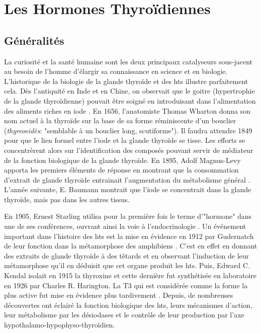 \documentclass[../main.tex]{subfiles}
\begin{document}
\chapter{Les Hormones Thyroïdiennes}


\section{Généralités}

La curiosité et la santé humaine sont les deux principaux catalyseurs sous-jacent au besoin de l'homme d'élargir sa connaissance en science et en biologie.
L'historique de la biologie de la glande thyroïde et des \glspl{ht} illustre parfaitement cela.
Dès l'antiquité en Inde et en Chine, on observait que le goitre (hypertrophie de la glande thyroïdienne) pouvait être soigné en introduisant dans l'alimentation des aliments riches en iode \citep{Niazi2011}.
En 1656, l'anatomiste Thomas Wharton donna son nom actuel à la thyroïde sur la base de sa forme réminiscente d'un bouclier (\textit{thyreoeidês}: "semblable à un bouclier long, scutiforme").
Il faudra attendre 1849 pour que le lien formel entre l'iode et la glande thyroïde se tisse.
Les efforts se concentrèrent alors sur l'identification des composés pouvant servir de médiateur de la fonction biologique de la glande thyroïde.
En 1895, Adolf Magnus-Levy apporta les premiers éléments de réponse en montrant que la consommation d'extrait de glande thyroïde entrainait l'augmentation du métabolisme général \citep{Magnus-Levy1895}.
L'année suivante, E. Baumann montrait que l'iode se concentrait dans la glande thyroïde, mais pas dans les autres tissus\citep{Baumann1896}.
\par
En 1905, Ernest Starling utilisa pour la première fois le terme d'"hormone" dans une de ses conférences, ouvrant ainsi la voie à l'endocrinologie .
Un événement important dans l'histoire des \glspl{ht} est la mise en évidence en 1912 par Gudernatch de leur fonction dans la métamorphose des amphibiens \citep{Gudernatsch1912}.
C'est en effet en donnant des extraits de glande thyroïde à des têtards et en observant l'induction de leur métamorphose qu'il en déduisit que cet organe produit les \glspl{ht}.
Puis, Edward C. Kendal isolait en 1915 la thyroxine et cette dernière fut synthétisée en laboratoire en 1926 par Charles R. Harington.
La T3 qui est considérée comme la forme la plus active fut mise en évidence plus tardivement \citep{Gross1952,Roche1952}.
Depuis, de nombreuses découvertes ont éclairé la fonction biologique des \glspl{ht}, leurs mécanismes d'action, leur métabolisme par les désiodases et le contrôle de leur production par l'axe hypothalamo-hypophyso-thyroïdien.
\end{document}
